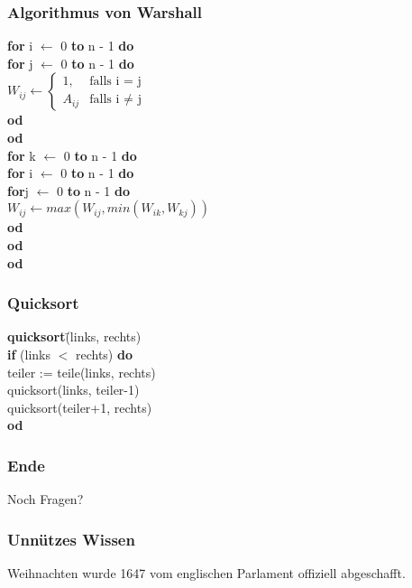 \documentclass{beamer}
\begin{document}
\begin{frame}
	\frametitle{Algorithmus von Warshall}

	\hspace{0.5 cm} \textbf{for} i $\leftarrow$ 0 \textbf{to} n - 1 \textbf{do} \\
	\hspace{1 cm} \textbf{for} j $\leftarrow$ 0 \textbf{to} n - 1 \textbf{do} \\
	\hspace{1.5 cm}	$W_{ij} \leftarrow 
			\begin{cases}
				1,  & \text{falls i = j}\\
				 A_{ij}  & \text{falls i $\ne$ j}
			\end{cases}$ \\
	\hspace{1 cm} \textbf{od}\\
	\hspace{0.5 cm} \textbf{od}\\
	\vspace{0.5 cm}
	\hspace{0.5 cm} \textbf{for} k $\leftarrow$ 0 \textbf{to} n - 1 \textbf{do} \\
	\hspace{1 cm} \textbf{for} i $\leftarrow$ 0 \textbf{to} n - 1 \textbf{do} \\
	\hspace{1.5 cm} \textbf{for}j $\leftarrow$ 0 \textbf{to} n - 1 \textbf{do} \\
	\hspace{2 cm} $W_{ij} \leftarrow max( W_{ij}, min(W_{ik}, W_{kj}) )$\\
	\hspace{1.5 cm} \textbf{od}	\\
	\hspace{1 cm} \textbf{od}	\\
	\hspace{0.5 cm} \textbf{od}	
\end{frame}

\begin{frame}
	\frametitle{Quicksort}
	\begin{tabbing}
	\textbf{quick}\=\textbf{sort}\=(links, rechts)\\
     	\>\textbf{if} (links $<$ rechts) \textbf{do}\\
         	\> \>teiler := teile(links, rechts)\\
         	\> \>quicksort(links, teiler-1)\\
         	\> \>quicksort(teiler+1, rechts)\\
     	\>\textbf{od}
	\end{tabbing}
\end{frame}

\begin {frame}
\frametitle {Ende}
	\begin {center}
		Noch Fragen?
	\end {center}
\end {frame}

\begin {frame}
\frametitle {Unnützes Wissen}
	\begin {center}
		Weihnachten wurde 1647 vom englischen Parlament offiziell abgeschafft.
	\end {center}
\end {frame}
\end{document}
